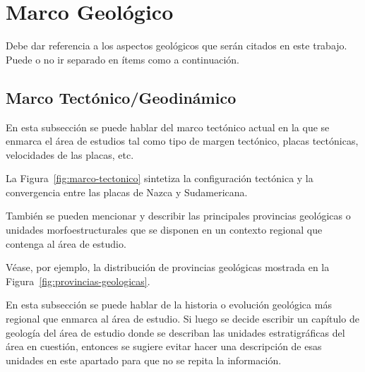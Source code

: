 \chapter{Marco Geológico}
Debe dar referencia a los aspectos geológicos que serán citados en este trabajo. Puede o no ir separado en ítems como a continuación.
        \section{Marco Tectónico/Geodinámico}
        En esta subsección se puede hablar del marco tectónico actual en la que se enmarca el área de estudios tal como tipo de margen tectónico, placas tectónicas, velocidades de las placas, etc.

        La Figura~\ref{fig:marco-tectonico} sintetiza la configuración
        tectónica y la convergencia entre las placas de Nazca y Sudamericana.

              
        También se pueden mencionar y describir las principales provincias geológicas o unidades morfoestructurales que se disponen en un contexto regional que contenga al área de estudio.

        Véase, por ejemplo, la distribución de provincias geológicas mostrada
        en la Figura~\ref{fig:provincias-geologicas}.

        
       
        
        En esta subsección se puede hablar de la historia o evolución geológica más regional que enmarca al área de estudio. Si luego se decide escribir un capítulo de geología del área de estudio donde se describan las unidades estratigráficas del área en cuestión, entonces se sugiere evitar hacer una descripción de esas unidades en este apartado para que no se repita la información.    

